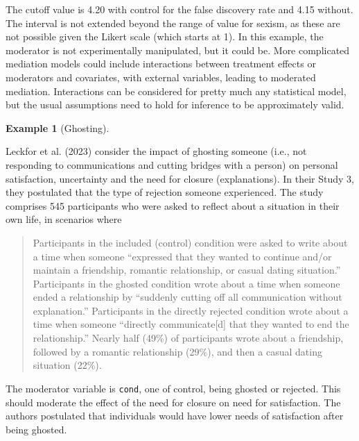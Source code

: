 \documentclass[
  11pt,
  letterpaper,
]{scrbook}
\theoremstyle{definition}
\newtheorem{example}{Example}[chapter]
\theoremstyle{definition}
\theoremstyle{remark}
\begin{document}
The cutoff value is 4.20 with control for the false discovery rate and
4.15 without. The interval is not extended beyond the range of value for
sexism, as these are not possible given the Likert scale (which starts
at 1). In this example, the moderator is not experimentally manipulated,
but it could be. More complicated mediation models could include
interactions between treatment effects or moderators and covariates,
with external variables, leading to moderated mediation. Interactions
can be considered for pretty much any statistical model, but the usual
assumptions need to hold for inference to be approximately valid.

\begin{example}[Ghosting]\protect\hypertarget{exm-moderation2}{}\label{exm-moderation2}

Leckfor et al. (2023) consider the impact of ghosting someone (i.e., not
responding to communications and cutting bridges with a person) on
personal satisfaction, uncertainty and the need for closure
(explanations). In their Study 3, they postulated that the type of
rejection someone experienced. The study comprises 545 participants who
were asked to reflect about a situation in their own life, in scenarios
where

\begin{quote}
Participants in the included (control) condition were asked to write
about a time when someone ``expressed that they wanted to continue
and/or maintain a friendship, romantic relationship, or casual dating
situation.'' Participants in the ghosted condition wrote about a time
when someone ended a relationship by ``suddenly cutting off all
communication without explanation.'' Participants in the directly
rejected condition wrote about a time when someone ``directly
communicate{[}d{]} that they wanted to end the relationship.'' Nearly
half (49\%) of participants wrote about a friendship, followed by a
romantic relationship (29\%), and then a casual dating situation (22\%).
\end{quote}

The moderator variable is \texttt{cond}, one of control, being ghosted
or rejected. This should moderate the effect of the need for closure on
need for satisfaction. The authors postulated that individuals would
have lower needs of satisfaction after being ghosted.


\end{example}
\end{document}
